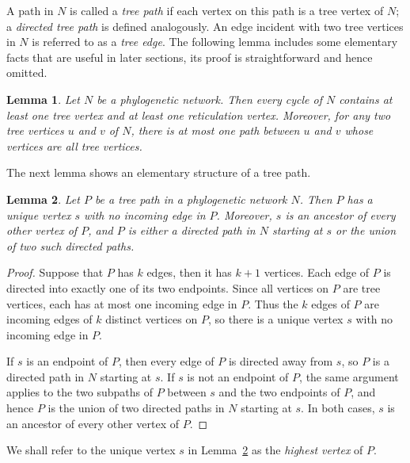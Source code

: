 \documentclass[pdflatex,sn-mathphys-num]{sn-jnl}
\theoremstyle{thmstyleone}%
\theoremstyle{thmstyletwo}%
\newtheorem{lemma}{Lemma}
\theoremstyle{thmstylethree}%
\begin{document}
A path in $N$ is called a \emph{tree path} if each vertex on this path is a tree vertex of $N$; a \emph{directed tree path} is defined analogously. An edge incident with two tree vertices in $N$ is referred to as a \emph{tree edge}. The following lemma includes some elementary facts that are useful in later sections, its proof is straightforward and hence omitted.


\begin{lemma}\label{lmm:cycle}
Let $N$ be a phylogenetic network. Then every cycle of $N$ contains at least one tree vertex and at least one reticulation vertex. Moreover, for any two tree vertices $u$ and $v$ of $N$, there is at most one path between $u$ and $v$ whose vertices are all tree vertices.
\end{lemma}


The next lemma shows an elementary structure of a tree path.

\begin{lemma}\label{lem:treepath-top} 
Let $P$ be a tree path in a phylogenetic network $N$. Then $P$ has a unique vertex $s$ with no incoming edge in $P$.
Moreover, $s$ is an ancestor of every other vertex of $P$, and $P$ is either a directed path in $N$ starting at $s$ or the union of two such directed paths.
\end{lemma}

\begin{proof} Suppose that $P$ has $k$ edges, then it has $k+1$ vertices. Each edge of $P$ is directed into exactly one of its two endpoints.
Since all vertices on $P$ are tree vertices, each has at most one incoming edge in $P$.
Thus the $k$ edges of $P$ are incoming edges of $k$ distinct vertices on $P$, so there is a unique vertex $s$ with no incoming edge in $P$.


If $s$ is an endpoint of $P$, then every edge of $P$ is directed away from $s$, so $P$ is a directed path in $N$ starting at $s$. If $s$ is not an endpoint of $P$, the same argument applies to the two subpaths of $P$ between $s$ and the two endpoints of $P$, and hence $P$ is the union of two directed paths in $N$ starting at $s$. In both cases, $s$ is an ancestor of every other vertex of $P$. \end{proof}

We shall refer to the unique vertex $s$ in Lemma~\ref{lem:treepath-top} as the \emph{highest vertex} of $P$.
\end{document}
